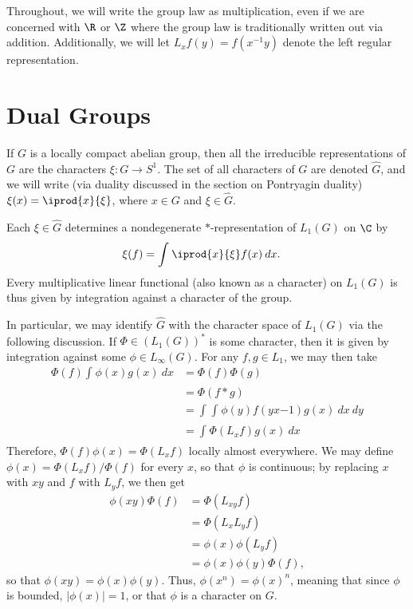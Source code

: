 \documentclass[10pt]{mypackage}
\begin{document}
\RaggedRight
Throughout, we will write the group law as multiplication, even if we are concerned with $\R$ or $\Z$ where the group law is traditionally written out via addition. Additionally, we will let $L_xf(y) = f\left( x^{-1}y \right)$ denote the left regular representation.
\section{Dual Groups}%
If $G$ is a locally compact abelian group, then all the irreducible representations of $G$ are the characters $\xi\colon G\rightarrow S^{1}$. The set of all characters of $G$ are denoted $\hat{G}$, and we will write (via duality discussed in the section on Pontryagin duality) $\xi(x) = \iprod{x}{\xi}$, where $x\in G$ and $\xi\in \hat{G}$.

Each $\xi\in \hat{G}$ determines a nondegenerate $\ast$-representation of $L_1(G)$ on $\C$ by
\begin{align*}
  \xi(f) &= \int_{}^{} \iprod{x}{\xi}f(x)\:dx.
\end{align*}
Every multiplicative linear functional (also known as a character) on $L_1(G)$ is thus given by integration against a character of the group.

In particular, we may identify $\hat{G}$ with the character space of $L_1(G)$ via the following discussion. If $\Phi\in \left( L_1(G) \right)^{\ast}$ is some character, then it is given by integration against some $\phi\in L_{\infty}\left( G \right)$. For any $f,g\in L_1$, we may then take
\begin{align*}
  \Phi(f) \int_{}^{} \phi(x)g(x)\:dx &= \Phi(f)\Phi(g)\\
                                     &= \Phi\left( f\ast g \right)\\
                                     &= \int_{}^{} \int_{}^{} \phi(y)f\left( yx{-1} \right)g(x)\:dx\:dy\\
                                     &= \int_{}^{} \Phi\left( L_xf \right)g(x)\:dx
\end{align*}
Therefore, $\Phi(f)\phi(x) = \Phi\left( L_xf \right)$ locally almost everywhere. We may define $\phi(x) = \Phi(L_xf)/\Phi(f)$ for every $x$, so that $\phi$ is continuous; by replacing $x$ with $xy$ and $f$ with $L_yf$, we then get
\begin{align*}
  \phi\left( xy \right)\Phi(f) &= \Phi\left( L_{xy}f \right)\\
                               &= \Phi\left( L_xL_yf \right)\\
                               &= \phi(x)\phi\left( L_yf \right)\\
                               &= \phi(x)\phi(y)\Phi(f),
\end{align*}
so that $\phi\left( xy \right)=\phi(x)\phi(y)$. Thus, $\phi\left( x^{n} \right) = \phi\left( x \right)^{n}$, meaning that since $\phi$ is bounded, $\left\vert \phi(x) \right\vert = 1$, or that $\phi$ is a character on $G$.
\end{document}
